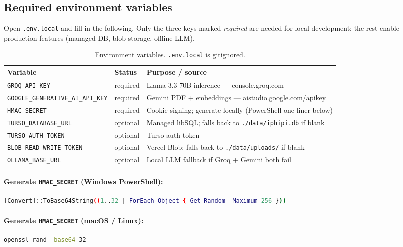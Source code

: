 \documentclass[11pt,a4paper]{article}
\begin{document}
\subsection{Required environment variables}

Open \texttt{.env.local} and fill in the following. Only the three keys
marked \emph{required} are needed for local development; the rest enable
production features (managed DB, blob storage, offline LLM).

\begin{table}[h]
\centering
\renewcommand{\arraystretch}{1.25}
\begin{tabular}{@{}p{4.6cm} p{1.6cm} p{8.6cm}@{}}
\toprule
\textbf{Variable} & \textbf{Status} & \textbf{Purpose / source} \\
\midrule
\texttt{GROQ\_API\_KEY}                 & required & Llama 3.3 70B inference --- console.groq.com \\
\texttt{GOOGLE\_GENERATIVE\_AI\_API\_KEY} & required & Gemini PDF + embeddings --- aistudio.google.com/apikey \\
\texttt{HMAC\_SECRET}                   & required & Cookie signing; generate locally (PowerShell one-liner below) \\
\texttt{TURSO\_DATABASE\_URL}           & optional & Managed libSQL; falls back to \texttt{./data/iphipi.db} if blank \\
\texttt{TURSO\_AUTH\_TOKEN}             & optional & Turso auth token \\
\texttt{BLOB\_READ\_WRITE\_TOKEN}       & optional & Vercel Blob; falls back to \texttt{./data/uploads/} if blank \\
\texttt{OLLAMA\_BASE\_URL}              & optional & Local LLM fallback if Groq + Gemini both fail \\
\bottomrule
\end{tabular}
\caption{Environment variables. \texttt{.env.local} is gitignored.}
\end{table}

\paragraph{Generate \texttt{HMAC\_SECRET} (Windows PowerShell):}
\begin{lstlisting}[language=bash]
[Convert]::ToBase64String((1..32 | ForEach-Object { Get-Random -Maximum 256 }))
\end{lstlisting}

\paragraph{Generate \texttt{HMAC\_SECRET} (macOS / Linux):}
\begin{lstlisting}[language=bash]
openssl rand -base64 32
\end{lstlisting}
\end{document}
